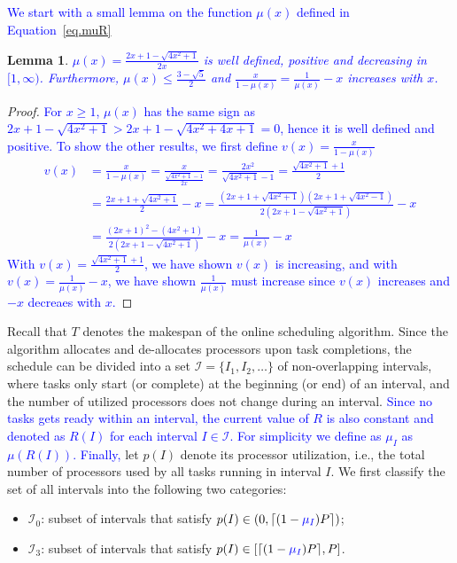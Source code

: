 \documentclass{article}
\newtheorem{lemma}{Lemma}
\newcommand\ratio{R\xspace}
\newcommand{\new}[1]{\textcolor{blue}{#1}}
\begin{document}
\new{We start with a small lemma on the function $\mu(x)$ defined in Equation~\ref{eq.muR}}
\begin{lemma}
\label{lem.muprop}
\new{$\mu(x)=\frac{2x+1-\sqrt{4x^2+1}}{2x}$ is well defined, positive and decreasing in $[1, \infty)$. Furthermore, $\mu(x) \leq \frac{3-\sqrt{5}}{2}$ and $\frac{x}{1-\mu(x)}=\frac{1}{\mu(x)}-x$ increases with $x$.}
\end{lemma}
\begin{proof}
\new{For $x\geq 1$, $\mu(x)$ has the same sign as $2x+1-\sqrt{4x^2+1} > 2x+1-\sqrt{4x^2+4x+1}=0$, hence it is well defined and positive. To show the other results, we first define $v(x)=\frac{x}{1-\mu(x)}$
\begin{align*}
v(x)&=\frac{x}{1-\mu(x)}=\frac{x}{\frac{\sqrt{4x^2+1}-1}{2x}}= \frac{2x^2}{\sqrt{4x^2+1}-1}=\frac{\sqrt{4x^2+1}+1}{2}\\
&= \frac{2x+1+\sqrt{4x^2+1}}{2}-x=\frac{(2x+1+\sqrt{4x^2+1})(2x+1+\sqrt{4x^2-1})}{2(2x+1-\sqrt{4x^2+1})}-x \\
&= \frac{(2x+1)^2-(4x^2+1)}{2(2x+1-\sqrt{4x^2+1})}-x =\frac{1}{\mu(x)}-x
\end{align*}
With $v(x)= \frac{\sqrt{4x^2+1}+1}{2}$, we have shown $v(x)$ is increasing, and with $v(x)=\frac{1}{\mu(x)}-x$, we have shown $\frac{1}{\mu(x)}$ must increase since $v(x)$ increases and $-x$ decreaes with $x$.}
\end{proof}

Recall that $T$ denotes the makespan of the online scheduling algorithm. Since the algorithm allocates and de-allocates processors upon task completions, the schedule can be divided into a set $\mathcal{I} = \{I_1, I_2, \dots\}$ of non-overlapping intervals, where tasks only start (or complete) at the beginning (or end) of an interval, and the number of utilized processors does not change during an interval. \new{Since no tasks gets ready within an interval, the current value of $\ratio$ is also constant and denoted as $\ratio(I)$ for each interval  $I \in \mathcal{I}$. For simplicity we define as $\mu_I$ as $\mu(\ratio(I))$. Finally, }let $p(I)$ denote its processor utilization, i.e., the total number of processors used by all tasks running in interval $I$. We first classify the set of all intervals into the following two categories:
\begin{itemize}
\item $\mathcal{I}_0$: subset of intervals that satisfy $p(I) \in (0, \lceil (1-\new{\mu_I}) P \rceil)$;
\item $\mathcal{I}_3$: subset of intervals that satisfy $p(I) \in [\lceil (1-\new{\mu_I}) P \rceil, P]$.
\end{itemize}
\end{document}
